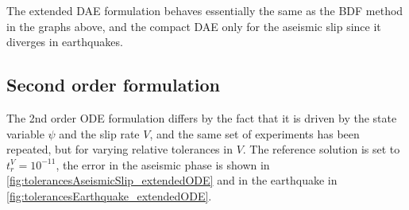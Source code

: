 The extended DAE formulation behaves essentially the same as the BDF method in the graphs above, and the compact DAE only for the aseismic slip since it diverges in earthquakes. \\

\subsection{Second order formulation}
The 2nd order ODE formulation differs by the fact that it is driven by the state variable $\psi$ and the slip rate $V$, and the same set of experiments has been repeated, but for varying relative tolerances in $V$. The reference solution is set to $t_r^V=10^{-11}$, the error in the aseismic phase is shown in \autoref{fig:tolerancesAseismicSlip_extendedODE} and in the earthquake in \autoref{fig:tolerancesEarthquake_extendedODE}.
